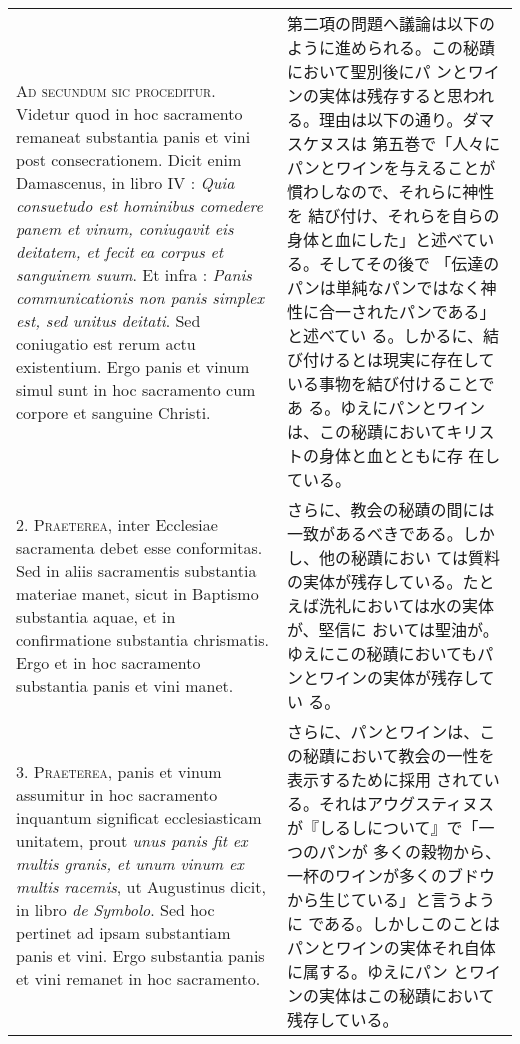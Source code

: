 \documentclass[10pt]{jsarticle} %
\begin{document}
\begin{longtable}{p{21em}p{21em}}

{\scshape Ad secundum sic proceditur}. Videtur quod in hoc sacramento
remaneat substantia panis et vini post consecrationem. Dicit enim
Damascenus, in libro IV : {\itshape Quia consuetudo est hominibus
comedere panem et vinum, coniugavit eis deitatem, et fecit ea corpus
et sanguinem suum}. Et infra : {\itshape Panis communicationis non
panis simplex est, sed unitus deitati}. Sed coniugatio est rerum actu
existentium. Ergo panis et vinum simul sunt in hoc sacramento cum
corpore et sanguine Christi.

&

第二項の問題へ議論は以下のように進められる。この秘蹟において聖別後にパ
ンとワインの実体は残存すると思われる。理由は以下の通り。ダマスケヌスは
第五巻で「人々にパンとワインを与えることが慣わしなので、それらに神性を
結び付け、それらを自らの身体と血にした」と述べている。そしてその後で
「伝達のパンは単純なパンではなく神性に合一されたパンである」と述べてい
る。しかるに、結び付けるとは現実に存在している事物を結び付けることであ
る。ゆえにパンとワインは、この秘蹟においてキリストの身体と血とともに存
在している。


\\



2. {\scshape Praeterea}, inter Ecclesiae sacramenta debet esse
conformitas. Sed in aliis sacramentis substantia materiae manet, sicut
in Baptismo substantia aquae, et in confirmatione substantia
chrismatis. Ergo et in hoc sacramento substantia panis et vini manet.

&

さらに、教会の秘蹟の間には一致があるべきである。しかし、他の秘蹟におい
ては質料の実体が残存している。たとえば洗礼においては水の実体が、堅信に
おいては聖油が。ゆえにこの秘蹟においてもパンとワインの実体が残存してい
る。


\\



3. {\scshape Praeterea}, panis et vinum assumitur in hoc sacramento
inquantum significat ecclesiasticam unitatem, prout {\itshape unus
panis fit ex multis granis, et unum vinum ex multis racemis}, ut
Augustinus dicit, in libro {\itshape de Symbolo}. Sed hoc pertinet ad
ipsam substantiam panis et vini. Ergo substantia panis et vini remanet
in hoc sacramento.

&


さらに、パンとワインは、この秘蹟において教会の一性を表示するために採用
されている。それはアウグスティヌスが『しるしについて』で「一つのパンが
多くの穀物から、一杯のワインが多くのブドウから生じている」と言うように
である。しかしこのことはパンとワインの実体それ自体に属する。ゆえにパン
とワインの実体はこの秘蹟において残存している。


\end{longtable}
\end{document}
